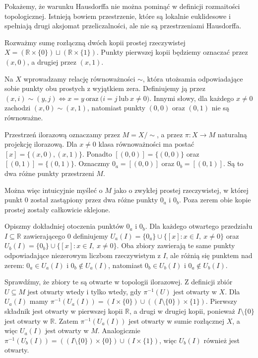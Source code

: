 \begin{przyklad}
Pokażemy, że warunku Hausdorffa nie można pominąć w definicji rozmaitości topologicznej. Istnieją bowiem przestrzenie, które są lokalnie euklidesowe i spełniają drugi aksjomat przeliczalności, ale nie są przestrzeniami Hausdorffa.

Rozważmy sumę rozłączną dwóch kopii prostej rzeczywistej $X=(\mathbb{R}\times\{0\})\sqcup(\mathbb{R}\times\{1\})$. Punkty pierwszej kopii będziemy oznaczać przez $(x,0)$, a drugiej przez $(x,1)$.

Na $X$ wprowadzamy relację równoważności $\sim$, która utożsamia odpowiadające sobie punkty obu prostych z wyjątkiem zera. Definiujemy ją przez
$(x,i)\sim(y,j)\Longleftrightarrow x=y\ \text{oraz}\ \bigl(i=j\ \text{lub}\ x\neq0\bigr)$.
Innymi słowy, dla każdego $x\neq0$ zachodzi $(x,0)\sim(x,1)$, natomiast punkty $(0,0)$ oraz $(0,1)$ nie są równoważne.

Przestrzeń ilorazową oznaczamy przez $M=X/\sim$, a przez $\pi\colon X\to M$ naturalną projekcję ilorazową. Dla $x\neq0$ klasa równoważności ma postać $[x]=\{(x,0),(x,1)\}$. Ponadto $[(0,0)]=\{(0,0)\}$ oraz $[(0,1)]=\{(0,1)\}$. Oznaczmy $0_a=[(0,0)]$ oraz $0_b=[(0,1)]$. Są to dwa różne punkty przestrzeni $M$.

Można więc intuicyjnie myśleć o $M$ jako o zwykłej prostej rzeczywistej, w której punkt $0$ został zastąpiony przez dwa różne punkty $0_a$ i $0_b$. Poza zerem obie kopie prostej zostały całkowicie sklejone.

Opiszmy dokładniej otoczenia punktów $0_a$ i $0_b$. Dla każdego otwartego przedziału $I\subseteq\mathbb{R}$ zawierającego $0$ definiujemy
$U_a(I)=\{0_a\}\cup\{[x]:x\in I,\ x\neq0\}$ oraz
$U_b(I)=\{0_b\}\cup\{[x]:x\in I,\ x\neq0\}$.
Oba zbiory zawierają te same punkty odpowiadające niezerowym liczbom rzeczywistym z $I$, ale różnią się punktem nad zerem: $0_a\in U_a(I)$ i $0_b\notin U_a(I)$, natomiast $0_b\in U_b(I)$ i $0_a\notin U_b(I)$.

Sprawdźmy, że zbiory te są otwarte w topologii ilorazowej. Z definicji zbiór $U\subseteq M$ jest otwarty wtedy i tylko wtedy, gdy $\pi^{-1}(U)$ jest otwarty w $X$. Dla $U_a(I)$ mamy
$\pi^{-1}(U_a(I))=(I\times\{0\})\cup((I\setminus\{0\})\times\{1\})$.
Pierwszy składnik jest otwarty w pierwszej kopii $\mathbb{R}$, a drugi w drugiej kopii, ponieważ $I\setminus\{0\}$ jest otwarty w $\mathbb{R}$. Zatem $\pi^{-1}(U_a(I))$ jest otwarty w sumie rozłącznej $X$, a więc $U_a(I)$ jest otwarty w $M$. Analogicznie
$\pi^{-1}(U_b(I))=((I\setminus\{0\})\times\{0\})\cup(I\times\{1\})$,
więc $U_b(I)$ również jest otwarty.


\end{przyklad}
